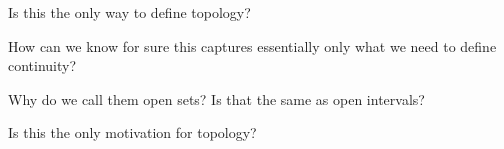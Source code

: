 \documentclass{beamer}
\begin{document}
\begin{frame}[c]
    \centering
    \begin{minipage}{\textwidth}
      \centering
        \huge Is this the only way to define topology?
        \vspace{5mm}
    \end{minipage}
\end{frame}

\begin{frame}[c]
    \centering
    \begin{minipage}{\textwidth}
      \centering
        \huge How can we know for sure this captures essentially only what we need to define continuity?
        \vspace{5mm}
    \end{minipage}
\end{frame}

\begin{frame}[c]
    \centering
    \begin{minipage}{\textwidth}
      \centering
        \huge Why do we call them open sets? Is that the same as open intervals?
        \vspace{5mm}
    \end{minipage}
\end{frame}

\begin{frame}[c]
    \centering
    \begin{minipage}{\textwidth}
      \centering
        \huge Is this the only motivation for topology?
        \vspace{5mm}
    \end{minipage}
\end{frame}


\backmatter
\end{document}
